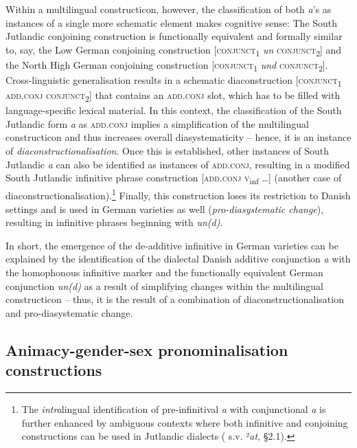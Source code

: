 \documentclass[output=paper]{langsci/langscibook}
\begin{document}
Within a multilingual constructicon, however, the classification of both \textit{a}’s as instances of a single more schematic element makes cognitive sense: The South Jutlandic conjoining construction is functionally equivalent and formally similar to, say, the Low German conjoining construction {[}\textsc{conjunct}\textsubscript{1} \textit{un} \textsc{conjunct}\textsubscript{2}{]} and the North High German conjoining construction {[}\textsc{conjunct}\textsubscript{1} \textit{und} \textsc{conjunct}\textsubscript{2}{]}. Cross-linguistic generalisation results in a schematic diaconstruction {[}\textsc{conjunct}\textsubscript{1} \textsc{add.conj} \textsc{conjunct}\textsubscript{2}{]} that contains an \textsc{add.conj} slot, which has to be filled with language-specific lexical material. In this context, the classification of the South Jutlandic form \textit{a} as \textsc{add.conj} implies a simplification of the multilingual constructicon and thus increases overall diasystematicity -- hence, it is an instance of \textit{diaconstructionalisation}. Once this is established, other instances of South Jutlandic \textit{a} can also be identified as instances of \textsc{add.conj}, resulting in a modified South Jutlandic infinitive phrase construction {[}\textsc{add.conj} \textsc{v}\textsubscript{inf} …{]} (another case of diaconstructionalisation).\footnote{The \textit{intra}lingual identification of pre-infinitival \textit{a} with conjunctional \textit{a} is further enhanced by ambiguous contexts where both infinitive and conjoining constructions can be used in Jutlandic dialects (\citealt{Rasmussen.1965} s.v. ²\textit{at}, §2.1).} Finally, this construction loses its restriction to Danish settings and is used in German varieties as well (\textit{pro-diasystematic change}), resulting in infinitive phrases beginning with \textit{un(d)}.

In short, the emergence of the de-additive infinitive in German varieties can be explained by the identification of the dialectal Danish additive conjunction \textit{a} with the homophonous infinitive marker and the functionally equivalent German conjunction \textit{un(d)} as a result of simplifying changes within the multilingual constructicon – thus, it is the result of a combination of diaconstructionalisation and pro-diasystematic change.


 
 \subsection{Animacy-gender-sex pronominalisation constructions}
 \label{sec:hoeder:4.4}
\end{document}
